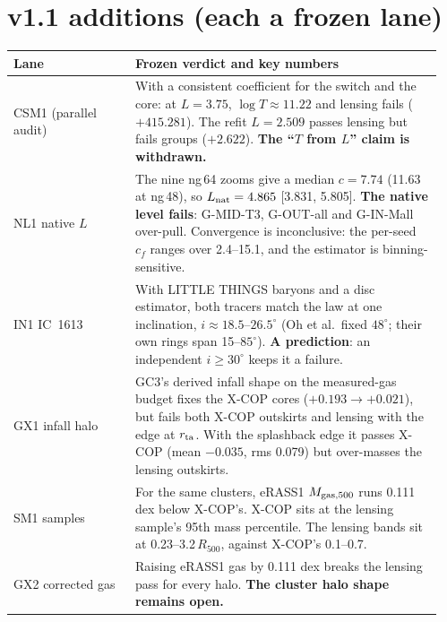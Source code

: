 \documentclass[10pt]{article}
\begin{document}
\section{v1.1 additions (each a frozen lane)}
\begin{tabular}{@{}p{0.27\linewidth}p{0.68\linewidth}@{}}\toprule
Lane & Frozen verdict and key numbers \\ \midrule
CSM1 (parallel audit) & With a consistent coefficient for the switch and the core: at $L=3.75$, $\log T\approx11.22$ and lensing fails ($+415.281$). The refit $L=2.509$ passes lensing but fails groups ($+2.622$). \textbf{The ``$T$ from $L$'' claim is withdrawn.} \\
NL1 native $L$ & The nine ng\,64 zooms give a median $c=7.74$ (11.63 at ng\,48), so $L_{\rm nat}=4.865$ [3.831, 5.805]. \textbf{The native level fails}: G-MID-T3, G-OUT-all and G-IN-Mall over-pull. Convergence is inconclusive: the per-seed $c_f$ ranges over 2.4--15.1, and the estimator is binning-sensitive. \\
IN1 IC~1613 & With LITTLE THINGS baryons and a disc estimator, both tracers match the law at one inclination, $i\approx18.5$--$26.5^\circ$ (Oh et al.\ fixed $48^\circ$; their own rings span 15--$85^\circ$). \textbf{A prediction}: an independent $i\ge30^\circ$ keeps it a failure. \\
GX1 infall halo & GC3's derived infall shape on the measured-gas budget fixes the X-COP cores ($+0.193\to+0.021$), but fails both X-COP outskirts and lensing with the edge at $r_{\rm ta}$. With the splashback edge it passes X-COP (mean $-0.035$, rms 0.079) but over-masses the lensing outskirts. \\
SM1 samples & For the same clusters, eRASS1 $M_{\rm gas,500}$ runs 0.111 dex below X-COP's. X-COP sits at the lensing sample's 95th mass percentile. The lensing bands sit at 0.23--3.2\,$R_{500}$, against X-COP's 0.1--0.7. \\
GX2 corrected gas & Raising eRASS1 gas by 0.111 dex breaks the lensing pass for every halo. \textbf{The cluster halo shape remains open.} \\ \bottomrule
\end{tabular}
\end{document}
